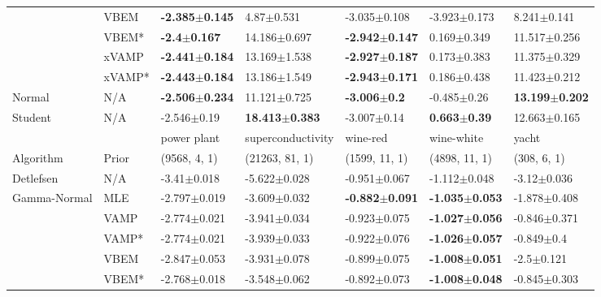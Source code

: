 \begin{tabular}{lllllll}
        & VBEM &  \textbf{-2.385$\pm$0.145} &             4.87$\pm$0.531 &           -3.035$\pm$0.108 &         -3.923$\pm$0.173 &            8.241$\pm$0.141 \\
        & VBEM* &    \textbf{-2.4$\pm$0.167} &           14.186$\pm$0.697 &  \textbf{-2.942$\pm$0.147} &          0.169$\pm$0.349 &           11.517$\pm$0.256 \\
        & xVAMP &  \textbf{-2.441$\pm$0.184} &           13.169$\pm$1.538 &  \textbf{-2.927$\pm$0.187} &          0.173$\pm$0.383 &           11.375$\pm$0.329 \\
        & xVAMP* &  \textbf{-2.443$\pm$0.184} &           13.186$\pm$1.549 &  \textbf{-2.943$\pm$0.171} &          0.186$\pm$0.438 &           11.423$\pm$0.212 \\
Normal & N/A &  \textbf{-2.506$\pm$0.234} &           11.121$\pm$0.725 &    \textbf{-3.006$\pm$0.2} &          -0.485$\pm$0.26 &  \textbf{13.199$\pm$0.202} \\
Student & N/A &            -2.546$\pm$0.19 &  \textbf{18.413$\pm$0.383} &            -3.007$\pm$0.14 &  \textbf{0.663$\pm$0.39} &           12.663$\pm$0.165 \\
\midrule
        &     &                power plant &          superconductivity &                   wine-red &                 wine-white &                      yacht \\
Algorithm & Prior& (9568, 4, 1)& (21263, 81, 1)& (1599, 11, 1)& (4898, 11, 1)& (308, 6, 1)\\
\midrule
Detlefsen & N/A &            -3.41$\pm$0.018 &           -5.622$\pm$0.028 &           -0.951$\pm$0.067 &           -1.112$\pm$0.048 &            -3.12$\pm$0.036 \\
Gamma-Normal & MLE &           -2.797$\pm$0.019 &           -3.609$\pm$0.032 &  \textbf{-0.882$\pm$0.091} &  \textbf{-1.035$\pm$0.053} &           -1.878$\pm$0.408 \\
        & VAMP &           -2.774$\pm$0.021 &           -3.941$\pm$0.034 &           -0.923$\pm$0.075 &  \textbf{-1.027$\pm$0.056} &           -0.846$\pm$0.371 \\
        & VAMP* &           -2.774$\pm$0.021 &           -3.939$\pm$0.033 &           -0.922$\pm$0.076 &  \textbf{-1.026$\pm$0.057} &             -0.849$\pm$0.4 \\
        & VBEM &           -2.847$\pm$0.053 &           -3.931$\pm$0.078 &           -0.899$\pm$0.075 &  \textbf{-1.008$\pm$0.051} &             -2.5$\pm$0.121 \\
        & VBEM* &           -2.768$\pm$0.018 &           -3.548$\pm$0.062 &           -0.892$\pm$0.073 &  \textbf{-1.008$\pm$0.048} &           -0.845$\pm$0.303 \\

\end{tabular}
